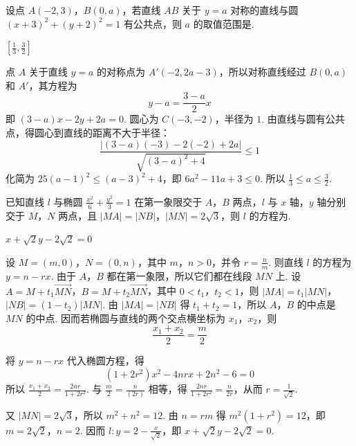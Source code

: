 \begin{problem}
设点 \(A(-2,3)\)，\(B(0,a)\)，若直线 \(AB\) 关于 \(y=a\) 对称的直线与圆 \((x+3)^2+(y+2)^2=1\) 有公共点，则 \(a\) 的取值范围是\fillinblank{}.
\end{problem}

\begin{answer}
\(\left[\frac{1}{3},\frac{3}{2}\right]\)
\end{answer}

\begin{solution}
点 \(A\) 关于直线 \(y=a\) 的对称点为 \(A'(-2,2a-3)\)，所以对称直线经过 \(B(0,a)\) 和 \(A'\)，其方程为
\[
y-a=\frac{3-a}{2}x
\]
即 \((3-a)x-2y+2a=0\). 圆心为 \(C(-3,-2)\)，半径为 \(1\). 由直线与圆有公共点，得圆心到直线的距离不大于半径：
\[
\frac{|(3-a)(-3)-2(-2)+2a|}{\sqrt{(3-a)^2+4}}\le1
\]
化简为 \(25(a-1)^2\le(a-3)^2+4\)，即 \(6a^2-11a+3\le0\). 所以
\(\frac13\le a\le\frac32\).
\end{solution}


\begin{problem}
已知直线 \(l\) 与椭圆 \(\frac{x^2}{6}+\frac{y^2}{3}=1\) 在第一象限交于 \(A\)，\(B\) 两点，\(l\) 与 \(x\) 轴，\(y\) 轴分别交于 \(M\)，\(N\) 两点，且 \(|MA|=|NB|\)，\(|MN|=2\sqrt3\)，则 \(l\) 的方程为\fillinblank{}.
\end{problem}

\begin{answer}
\(x+\sqrt2y-2\sqrt2=0\)
\end{answer}

\begin{solution}
设 \(M=(m,0)\)，\(N=(0,n)\)，其中 \(m\)，\(n>0\)，并令 \(r=\frac{n}{m}\). 则直线 \(l\) 的方程为 \(y=n-rx\). 由于 \(A\)，\(B\) 都在第一象限，所以它们都在线段 \(MN\) 上. 设
\(A=M+t_1\overrightarrow{MN}\)，\(B=M+t_2\overrightarrow{MN}\)，其中 \(0<t_1\)，\(t_2<1\)，则 \(|MA|=t_1|MN|\)，\(|NB|=(1-t_2)|MN|\). 由 \(|MA|=|NB|\) 得 \(t_1+t_2=1\)，所以 \(A\)，\(B\) 的中点是 \(MN\) 的中点. 因而若椭圆与直线的两个交点横坐标为 \(x_1\)，\(x_2\)，则
\[
\frac{x_1+x_2}{2}=\frac m2
\]

将 \(y=n-rx\) 代入椭圆方程，得
\[
(1+2r^2)x^2-4nrx+2n^2-6=0
\]
所以 \(\frac{x_1+x_2}{2}=\frac{2nr}{1+2r^2}\). 与 \(\frac{m}{2}=\frac{n}{(2r)}\) 相等，得
\(\frac{2nr}{1+2r^2}=\frac{n}{2r}\)，从而 \(r=\frac1{\sqrt2}\).

又 \(|MN|=2\sqrt3\)，所以 \(m^2+n^2=12\). 由 \(n=rm\) 得
\(m^2(1+r^2)=12\)，即 \(m=2\sqrt2\)，\(n=2\). 因而
\(l:y=2-\frac{x}{\sqrt2}\)，即 \(x+\sqrt2y-2\sqrt2=0\).
\end{solution}

